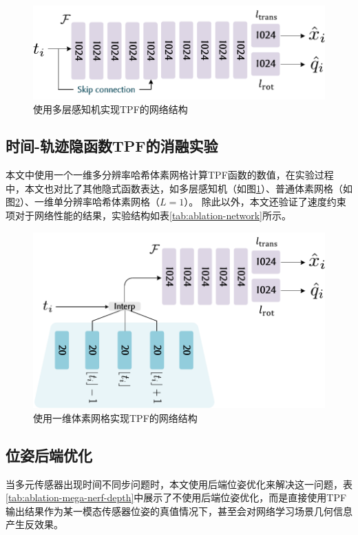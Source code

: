 \begin{figure}[ht]
    \centering
    \includegraphics[width=\textwidth]{undergraduate-thesis/images/experiments/time-pose MLP.pdf}
    \caption{使用多层感知机实现TPF的网络结构}
    \label{fig:time-pose function ablation mlp}
\end{figure}


\subsection{时间-轨迹隐函数TPF的消融实验}
本文中使用一个一维多分辨率哈希体素网格计算TPF函数的数值，在实验过程中，本文也对比了其他隐式函数表达，如多层感知机（如图\ref{fig:time-pose function ablation mlp}）、普通体素网格（如图\ref{fig:time-pose function ablation grid}）、一维单分辨率哈希体素网格（$L=1$）。
除此以外，本文还验证了速度约束项对于网络性能的结果，实验结构如表\ref{tab:ablation-network}所示。

\begin{figure}[ht]
    \centering
    \includegraphics[width=\textwidth]{undergraduate-thesis/images/experiments/FeatureGrid.pdf}
    \caption{使用一维体素网格实现TPF的网络结构}
    \label{fig:time-pose function ablation grid}
\end{figure}

\subsection{位姿后端优化}
当多元传感器出现时间不同步问题时，本文使用后端位姿优化来解决这一问题，表\ref{tab:ablation-mega-nerf-depth}中展示了不使用后端位姿优化，而是直接使用TPF输出结果作为某一模态传感器位姿的真值情况下，甚至会对网络学习场景几何信息产生反效果。



